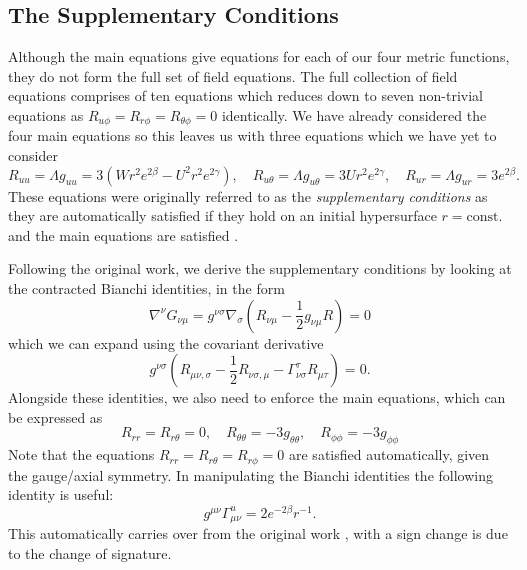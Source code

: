 \documentclass[a4paper,11pt]{article}
\numberwithin{equation}{section}
\begin{document}
\subsection{The Supplementary Conditions}
Although the main equations give equations for each of our four metric functions, they do not form the full set of field equations. The full collection of field equations comprises of ten equations which reduces down to seven non-trivial equations as $R_{u \phi}=R_{r \phi}=R_{\theta \phi}=0$ identically. We have already considered the four main equations so this leaves us with three equations which we have yet to consider
\begin{equation}
R_{uu}=\Lambda g_{uu}=3(Wr^2e^{2\beta}-U^2r^2e^{2\gamma}) , \quad R_{u\theta}=\Lambda g_{u \theta}=3Ur^2e^{2\gamma}, \quad R_{u r}=\Lambda g_{u r}=3 e^{2\beta}.
\end{equation} 
These equations were originally referred to as the {\it supplementary conditions} as they are automatically satisfied if they hold on an initial hypersurface $r=\text{const.}$ and the main equations are satisfied \cite{Sachs:1962wk}. 

Following the original work, we derive the supplementary conditions by looking at the contracted Bianchi identities, in the form
\begin{equation}
\nabla^{\nu}G_{\nu \mu}=g^{\nu \sigma}\nabla_{\sigma }\left(R_{\nu \mu}-\frac{1}{2}g_{\nu \mu}R\right)=0
\end{equation}
which we can expand using the covariant derivative
\begin{equation}
g^{\nu \sigma} \left(R_{\mu \nu, \sigma}-\frac{1}{2} R_{\nu \sigma, \mu} -\Gamma^{\tau}_{\nu \sigma} R_{\mu \tau}\right)=0.
\end{equation} 
Alongside these identities, we also need to enforce the main equations, which can be expressed as 
\begin{equation}
R_{rr}=R_{r \theta}=0, \quad R_{\theta \theta}=-3 g_{\theta \theta}, \quad R_{\phi \phi}=-3 g_{\phi \phi}
\end{equation}
Note that the equations $R_{r r}=R_{r \theta}=R_{r \phi}=0$ are satisfied automatically, given the gauge/axial symmetry. In manipulating the Bianchi identities the following identity is useful: 
\begin{equation} \label{eq: Christoffel_Identity}
g^{\mu \nu} \Gamma^{u}_{\mu \nu}= 2e^{-2\beta} r^{-1}.
\end{equation}
This automatically carries over from the original work \cite{Bondi:1962px}, with a sign change is due to the change of signature.
\end{document}
